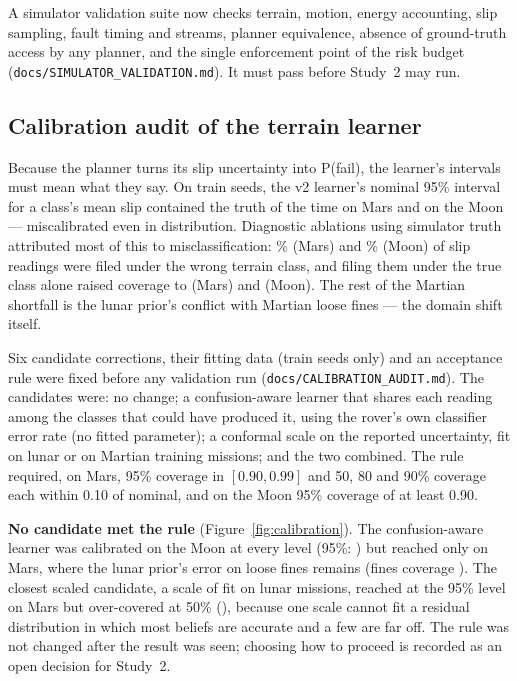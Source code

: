 \documentclass[11pt]{article}
\begin{document}
A simulator validation suite now checks terrain, motion, energy accounting,
slip sampling, fault timing and streams, planner equivalence, absence of
ground-truth access by any planner, and the single enforcement point of the
risk budget (\texttt{docs/SIMULATOR\_VALIDATION.md}). It must pass before
Study~2 may run.

\subsection{Calibration audit of the terrain learner}

Because the planner turns its slip uncertainty into P(fail), the learner's
intervals must mean what they say. On train seeds, the v2 learner's nominal
95\% interval for a class's mean slip contained the truth
\CalDiagBaseMarsCovNinetyFive{} of the time on Mars and
\CalDiagBaseMoonCovNinetyFive{} on the Moon --- miscalibrated even in
distribution. Diagnostic ablations using simulator truth attributed most of
this to misclassification: \CalMisclassShareMars\% (Mars) and
\CalMisclassShareMoon\% (Moon) of slip readings were filed under the wrong
terrain class, and filing them under the true class alone raised coverage to
\CalDiagNoMisclassMarsCovNinetyFive{} (Mars) and
\CalDiagNoMisclassMoonCovNinetyFive{} (Moon). The rest of the Martian shortfall
is the lunar prior's conflict with Martian loose fines --- the domain shift itself.

Six candidate corrections, their fitting data (train seeds only) and an
acceptance rule were fixed before any validation run
(\texttt{docs/CALIBRATION\_AUDIT.md}). The candidates were: no change; a
confusion-aware learner that shares each reading among the classes that could
have produced it, using the rover's own classifier error rate (no fitted
parameter); a conformal scale on the reported uncertainty, fit on lunar or on
Martian training missions; and the two combined. The rule required, on Mars,
95\% coverage in $[0.90, 0.99]$ and 50, 80 and 90\% coverage each within 0.10 of
nominal, and on the Moon 95\% coverage of at least 0.90.

\textbf{No candidate met the rule} (Figure~\ref{fig:calibration}). The
confusion-aware learner was calibrated on the Moon at every level (95\%:
\CalMThreeMoonCovNinetyFive{}) but reached only \CalMThreeMarsCovNinetyFive{}
on Mars, where the lunar prior's error on loose fines remains (fines coverage
\CalMThreeMarsFinesCov{}). The closest scaled candidate, a scale of
\CalScaleMTwoMoon{} fit on lunar missions, reached \CalMTwoAMarsCovNinetyFive{}
at the 95\% level on Mars but over-covered at 50\%
(\CalMTwoAMarsCovFifty{}), because one scale cannot fit a residual distribution
in which most beliefs are accurate and a few are far off. The rule was not
changed after the result was seen; choosing how to proceed is recorded as an
open decision for Study~2.
\end{document}
